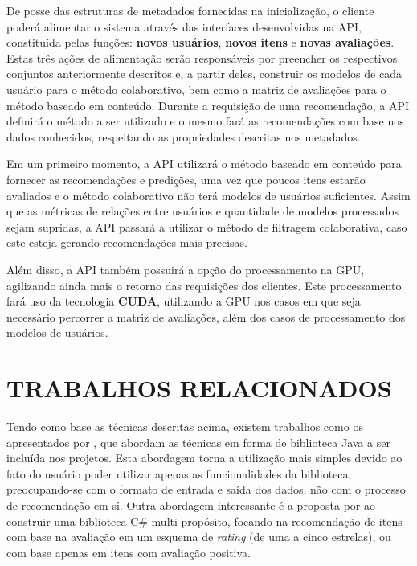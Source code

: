 \documentclass[12pt, openright, oneside, a4paper, brazil]{abntex2}
\begin{document}
De posse das estruturas de metadados fornecidas na inicialização, o cliente poderá alimentar o sistema através das interfaces desenvolvidas na API, constituída pelas funções: \textbf{novos usuários}, \textbf{novos itens} e \textbf{novas avaliações}. Estas três ações de alimentação serão responsáveis por preencher os respectivos conjuntos anteriormente descritos e, a partir deles, construir os modelos de cada usuário para o método colaborativo, bem como a matriz de avaliações para o método baseado em conteúdo. Durante a requisição de uma recomendação, a API definirá o método a ser utilizado e o mesmo fará as recomendações com base nos dados conhecidos, respeitando as propriedades descritas nos metadados.

Em um primeiro momento, a API utilizará o método baseado em conteúdo para fornecer as recomendações e predições, uma vez que poucos itens estarão avaliados e o método colaborativo não terá modelos de usuários suficientes. Assim que as métricas de relações entre usuários e quantidade de modelos processados sejam supridas, a API passará a utilizar o método de filtragem colaborativa, caso este esteja gerando recomendações mais precisas.

Além disso, a API também possuirá a opção do processamento na GPU, agilizando ainda mais o retorno das requisições dos clientes. Este processamento fará uso da tecnologia \textbf{CUDA}, utilizando a GPU nos casos em que seja necessário percorrer a matriz de avaliações, além dos casos de processamento dos modelos de usuários.

\section{TRABALHOS RELACIONADOS}

Tendo como base as técnicas descritas acima, existem trabalhos como os apresentados por , que abordam as técnicas em forma de biblioteca Java a ser incluída nos projetos. Esta abordagem torna a utilização mais simples devido ao fato do usuário poder utilizar apenas as funcionalidades da biblioteca, preocupando-se com o formato de entrada e saída dos dados, não com o processo de recomendação em si. Outra abordagem interessante é a proposta por  ao construir uma biblioteca C\# multi-propósito, focando na recomendação de itens com base na avaliação em um esquema de \textit{rating} (de uma a cinco estrelas), ou com base apenas em itens com avaliação positiva.
\end{document}
